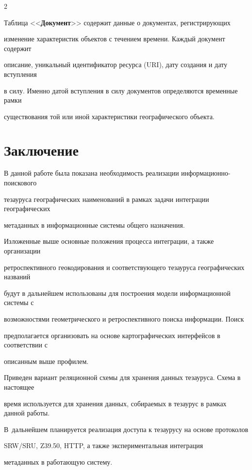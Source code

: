 \begin{multicols}{2}
  

  Таблица <<\textbf{Документ}>> содержит данные о документах, регистрирующих 

изменение характеристик объектов с течением времени. Каждый документ содержит 

описание, уникальный идентификатор ресурса ({URI}), дату создания и дату вступления 

в силу. Именно датой вступления в силу документов определяются временные рамки 

существования той или иной характеристики географического объекта.

  

  \section{Заключение}

  

  В данной работе была показана необходимость реализации информационно-поискового 

тезауруса географических наименований в рамках задачи интеграции географических 

метаданных в информационные системы общего назначения.

  

  Изложенные выше основные положения процесса интеграции, а также организации 

ретроспективного геокодирования и соответствующего тезауруса географических названий 

будут в дальнейшем использованы для построения модели информационной системы с 

возможностями геометрического и ретроспективного поиска информации. Поиск 

предполагается организовать на основе картографических интерфейсов в соответствии с 

описанным выше профилем.

  

  Приведен вариант реляционной схемы для хранения данных тезауруса. Схема в настоящее 

время используется для хранения данных, собираемых в тезаурус в рамках данной работы. 

В~дальнейшем планируется реализация доступа к тезаурусу на основе протоколов 

SRW/SRU, Z39.50, {HTTP}, а также экспериментальная интеграция 

метаданных в работающую систему.




\end{multicols}
